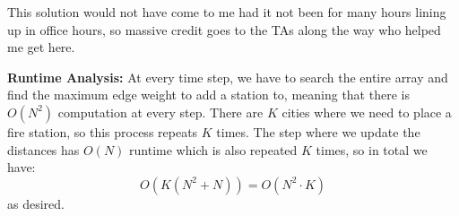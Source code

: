 \documentclass[11pt]{article}
\begin{document}
\begin{solution}
	This solution would not have come to me had it not been for many hours lining up in office hours, so 
	massive credit goes to the TAs along the way who helped me get here.  
	
	\textbf{Runtime Analysis:} At every time step, we have to search the entire array and find the maximum edge 
	weight to add a station to, meaning that there is $O(N^2)$ computation at every step. There are $K$ cities
	where we need to place a fire station, so this process repeats $K$ times. The step where we update 
	the distances has $O(N)$ runtime which is also repeated $K$ times, so in total we have:
	\[
	O(K(N^2 + N)) = O(N^2 \cdot K)
	\] 
	as desired. 




\end{solution}
\end{document}

